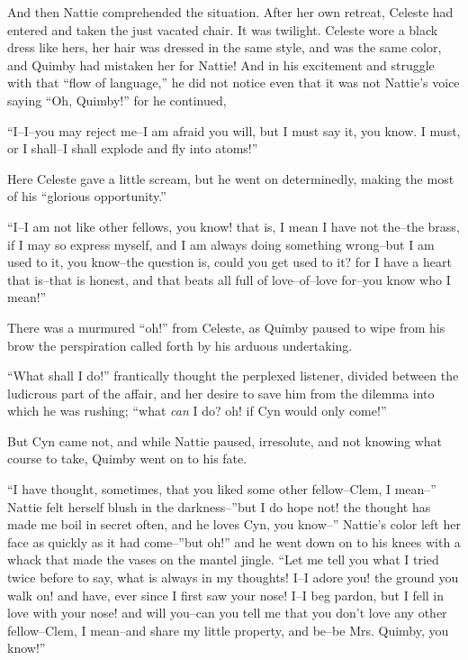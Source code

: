 And then Nattie comprehended the situation. After her own retreat,
Celeste had entered and taken the just vacated chair. It was twilight.
Celeste wore a black dress like hers, her hair was dressed in the same
style, and was the same color, and Quimby had mistaken her for Nattie!
And in his excitement and struggle with that ``flow of language,'' he did
not notice even that it was not Nattie's voice saying ``Oh, Quimby!'' for
he continued,

``I--I--you may reject me--I am afraid you will, but I must say it, you
know. I must, or I shall--I shall explode and fly into atoms!''

Here Celeste gave a little scream, but he went on determinedly, making
the most of his ``glorious opportunity.''

``I--I am not like other fellows, you know! that is, I mean I have not
the--the brass, if I may so express myself, and I am always doing
something wrong--but I am used to it, you know--the question is, could
you get used to it? for I have a heart that is--that is honest, and that
beats all full of love--of--love for--you know who I mean!''

There was a murmured ``oh!'' from Celeste, as Quimby paused to wipe from
his brow the perspiration called forth by his arduous undertaking.

``What shall I do!'' frantically thought the perplexed listener, divided
between the ludicrous part of the affair, and her desire to save him
from the dilemma into which he was rushing; ``what \emph{can} I do? oh! if Cyn
would only come!''

But Cyn came not, and while Nattie paused, irresolute, and not knowing
what course to take, Quimby went on to his fate.

``I have thought, sometimes, that you liked some other fellow--Clem, I
mean--'' Nattie felt herself blush in the darkness--''but I do hope not!
the thought has made me boil in secret often, and he loves Cyn, you
know--'' Nattie's color left her face as quickly as it had come--''but
oh!'' and he went down on to his knees with a whack that made the vases
on the mantel jingle. ``Let me tell you what I tried twice before to say,
what is always in my thoughts! I--I adore you! the ground you walk on!
and have, ever since I first saw your nose! I--I beg pardon, but I fell
in love with your nose! and will you--can you tell me that you don't
love any other fellow--Clem, I mean--and share my little property, and
be--be Mrs. Quimby, you know!''

